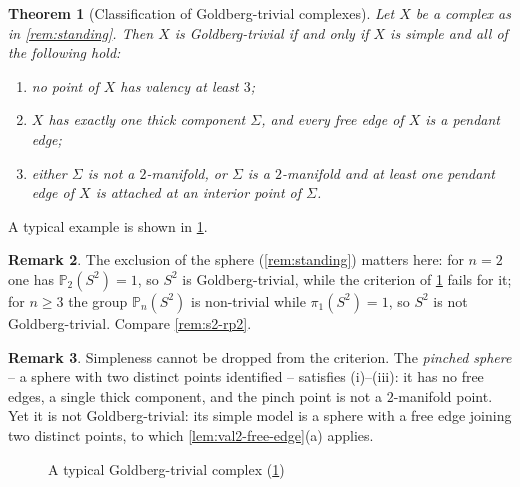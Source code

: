 \documentclass[reqno]{amsart}
\newtheorem{theorem}{Theorem}[section]
\theoremstyle{definition}
\newtheorem{remark}[theorem]{Remark}
\newcommand{\PB}{\mathbb{P}}
\numberwithin{equation}{section}
\begin{document}
\begin{theorem}[Classification of Goldberg-trivial
complexes]\label{thm:gt-classification}
Let \(X\) be a complex as in \cref{rem:standing}. Then
\(X\) is
Goldberg-trivial if and only if \(X\) is simple and all of the
following hold:
\begin{enumerate}[label=\textup{(\roman*)}, leftmargin=2em]
    \item no point of \(X\) has valency at least \(3\);
    \item \(X\) has exactly one thick component \(\Sigma\), and
          every free edge of \(X\) is a pendant edge;
    \item either \(\Sigma\) is not a \(2\)-manifold, or
          \(\Sigma\) is a \(2\)-manifold and at least one
          pendant edge of \(X\) is attached at an interior
          point of \(\Sigma\).
\end{enumerate}
\end{theorem}

A typical example is shown in \cref{fig:gt-example}.

\begin{remark}
The exclusion of the sphere (\cref{rem:standing}) matters
here: for \(n=2\) one has
\(\PB_2(S^2)=1\), so \(S^2\) is Goldberg-trivial, while the
criterion of \cref{thm:gt-classification} fails for it; for
\(n\geq3\) the group \(\PB_n(S^2)\) is non-trivial while
\(\pi_1(S^2)=1\), so \(S^2\) is not Goldberg-trivial. Compare
\cref{rem:s2-rp2}.
\end{remark}

\begin{remark}
Simpleness cannot be dropped from the criterion. The
\emph{pinched sphere} -- a sphere with two distinct points
identified -- satisfies (i)--(iii): it has no free edges, a
single thick component, and the pinch point is not a
\(2\)-manifold point. Yet it is not Goldberg-trivial: its simple
model is a sphere with a free edge joining two distinct points,
to which \cref{lem:val2-free-edge}(a) applies.
\end{remark}

\begin{figure}[ht]
\centering
{}
\caption{A typical Goldberg-trivial complex
(\cref{thm:gt-classification})
}
\label{fig:gt-example}
\end{figure}
\end{document}
